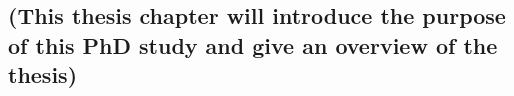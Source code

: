 

\hypertarget{this-thesis-chapter-will-introduce-the-purpose-of-this-phd-study-and-give-an-overview-of-the-thesis}{%
\subsection{(This thesis chapter will introduce the purpose of this PhD
study and give an overview of the
thesis)}\label{this-thesis-chapter-will-introduce-the-purpose-of-this-phd-study-and-give-an-overview-of-the-thesis}}